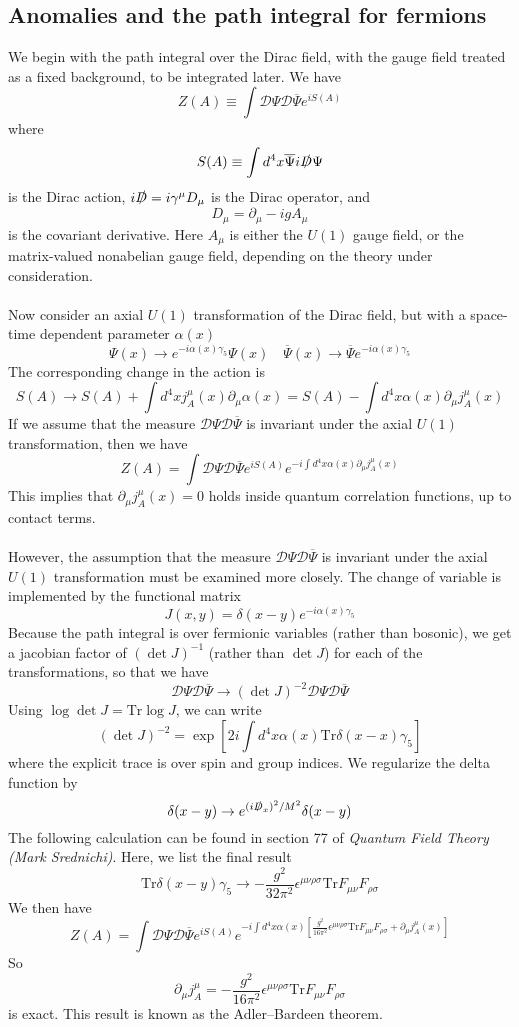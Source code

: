 \subsection{Anomalies and the path integral for fermions}
We begin with the path integral over the Dirac field, with the gauge field treated as a fixed background, to be integrated later. We have
\[Z(A) \equiv \int \mathcal{D}\Psi \mathcal{D}\overline{\Psi} e^{iS(A)}\]
where
\[S(A) \equiv \int d^4x \overline{\Psi}i\slashed{D}\Psi \]
is the Dirac action, $i\slashed{D} = i\gamma^{\mu} D_{\mu}$
is the Dirac operator, and
\[D_{\mu} = \partial_{\mu} - igA_{\mu}\]
is the covariant derivative. Here $A_{\mu}$ is either the $U(1)$ gauge field, or the matrix-valued nonabelian gauge field, depending on the theory under consideration.
\\ \\
Now consider an axial $U(1)$ transformation of the Dirac field, but with a space-time dependent parameter $\alpha(x)$
\[\Psi(x) \to e^{-i\alpha(x)\gamma_5}\Psi(x) \quad \overline{\Psi}(x) \to \overline{\Psi} e^{-i\alpha(x)\gamma_5}\]
The corresponding change in the action is
\[S(A) \to S(A) + \int d^4x j^{\mu}_A(x) \partial_{\mu}\alpha(x) = S(A) - \int d^4x \alpha(x) \partial_{\mu}j^{\mu}_A(x) \]
If we assume that the measure $\mathcal{D}\Psi \mathcal{D}\overline{\Psi}$ is invariant under the axial $U(1)$ transformation, then we have
\[Z(A) = \int \mathcal{D}\Psi \mathcal{D}\overline{\Psi} e^{iS(A)} e^{-i \int d^4x \alpha(x)\partial_{\mu}j^{\mu}_A(x) }\]
This implies that $\partial_{\mu}j^{\mu}_A(x) = 0$ holds inside quantum correlation functions, up to contact terms.
\\ \\
However, the assumption that the measure $\mathcal{D}\Psi \mathcal{D}\overline{\Psi}$ is invariant under the axial $U(1)$ transformation must be examined more closely. The change of variable is implemented by the functional matrix
\[J(x,y) = \delta(x-y)e^{-i\alpha(x)\gamma_5} \]
Because the path integral is over fermionic variables (rather than bosonic), we get a jacobian factor of $(\det J)^{-1}$ (rather than $\det J$) for each of the transformations, so that we have
\[\mathcal{D}\Psi \mathcal{D}\overline{\Psi} \to (\det J)^{-2}\mathcal{D}\Psi \mathcal{D}\overline{\Psi}\]
Using $\log \det J = \mathrm{Tr} \log J$, we can write
\[(\det J)^{-2} = \exp \left[2i \int d^4x \alpha(x) \mathrm{Tr}\delta(x-x)\gamma_5 \right]\]
where the explicit trace is over spin and group indices. We regularize the delta function by
\[\delta(x-y) \to e^{(i\slashed{D}_x)^2/M^2} \delta(x-y)\]
The following calculation can be found in section 77 of \emph{Quantum Field Theory (Mark Srednichi)}. Here, we list the final result
\[\mathrm{Tr} \delta(x-y)\gamma_5 \to - \frac{g^2}{32\pi^2} \epsilon^{\mu\nu\rho\sigma} \mathrm{Tr} F_{\mu\nu}F_{\rho\sigma}\]
We then have
\[Z(A) = \int \mathcal{D}\Psi \mathcal{D}\overline{\Psi} e^{iS(A)} e^{-i \int d^4x \alpha(x)[ \frac{g^2}{16\pi^2} \epsilon^{\mu\nu\rho\sigma} \mathrm{Tr} F_{\mu\nu}F_{\rho\sigma} +  \partial_{\mu}j^{\mu}_A(x)] }\]
So
\[\partial_{\mu} j^{\mu}_A = -\frac{g^2}{16\pi^2} \epsilon^{\mu\nu\rho\sigma} \mathrm{Tr} F_{\mu\nu}F_{\rho\sigma}\]
is exact. This result is known as the Adler–Bardeen theorem.

